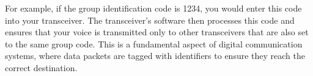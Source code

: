 For example, if the group identification code is 1234, you would enter this code into your transceiver. The transceiver’s software then processes this code and ensures that your voice is transmitted only to other transceivers that are also set to the same group code. This is a fundamental aspect of digital communication systems, where data packets are tagged with identifiers to ensure they reach the correct destination.

